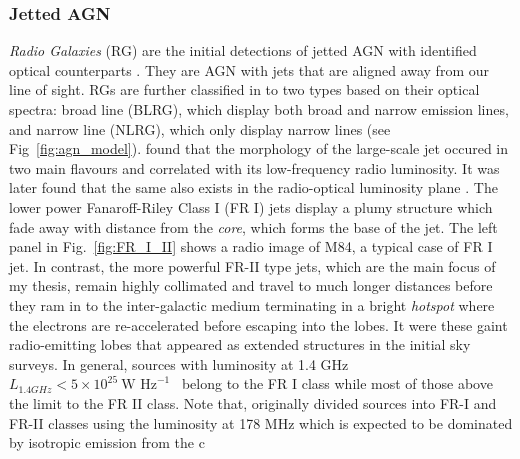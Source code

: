 \subsubsection{Jetted AGN}
\textit{Radio Galaxies} (RG) are the initial detections of jetted AGN with identified optical counterparts \citep[e.g.,][]{1954ApJ...119..215B}. They are AGN with jets that are aligned away from our line of sight. RGs are further classified in to two types based on their optical spectra: broad line (BLRG), which display both broad and narrow emission lines, and narrow line (NLRG), which only display narrow lines  (see Fig~\ref{fig:agn_model}).  \citet{fanaroff1974morphology} found that the morphology of the large-scale jet occured in two main flavours and correlated with its low-frequency radio luminosity. It was later found that the same also exists in the radio-optical luminosity plane \citep{owen1994fri}. The lower power Fanaroff-Riley Class I (FR I) jets display a plumy structure which fade away with distance from the \textit{core}, which forms the base of the jet. The left panel in Fig.~\ref{fig:FR_I_II} shows a radio image of M84, a typical case of FR I jet. In contrast, the more powerful FR-II type jets, which are the main focus of my thesis, remain highly collimated and travel to much longer distances before they ram in to the inter-galactic medium terminating in a bright \textit{hotspot} where the electrons are re-accelerated before escaping into the lobes. It were these gaint radio-emitting lobes that appeared as extended structures in the initial sky surveys. In general, sources with luminosity at 1.4 GHz $L_{1.4GHz}<5\times10^{25}~\textrm{W Hz}^{-1}$~
belong to the FR I class while most of those above the limit to the FR II class. Note that, \citet{fanaroff1974morphology}originally divided sources into FR-I and FR-II classes using the luminosity at 178 MHz which is expected to be dominated by isotropic emission from the c
